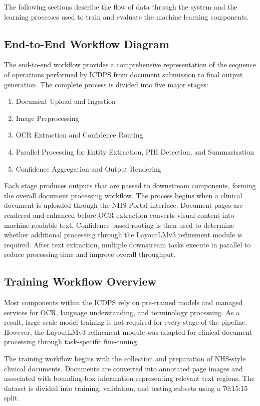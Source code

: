 The following sections describe the flow of data through the system and the learning processes used to train and evaluate the machine learning components.

\subsection{End-to-End Workflow Diagram}
The end-to-end workflow provides a comprehensive representation of the sequence of operations performed by ICDPS from document submission to final output generation. The complete process is divided into five major stages:

\begin{enumerate}
    \item Document Upload and Ingestion
    \item Image Preprocessing
    \item OCR Extraction and Confidence Routing
    \item Parallel Processing for Entity Extraction, PHI Detection, and Summarisation
    \item Confidence Aggregation and Output Rendering
\end{enumerate}

Each stage produces outputs that are passed to downstream components, forming the overall document processing workflow. The process begins when a clinical document is uploaded through the NHS Portal interface. Document pages are rendered and enhanced before OCR extraction converts visual content into machine-readable text. Confidence-based routing is then used to determine whether additional processing through the LayoutLMv3 refinement module is required. After text extraction, multiple downstream tasks execute in parallel to reduce processing time and improve overall throughput.

\subsection{Training Workflow Overview}

Most components within the ICDPS rely on pre-trained models and managed services for OCR, language understanding, and terminology processing. As a result, large-scale model training is not required for every stage of the pipeline. However, the LayoutLMv3 refinement module was adapted for clinical document processing through task-specific fine-tuning.

The training workflow begins with the collection and preparation of NHS-style clinical documents. Documents are converted into annotated page images and associated with bounding-box information representing relevant text regions. The dataset is divided into training, validation, and testing subsets using a 70:15:15 split.

